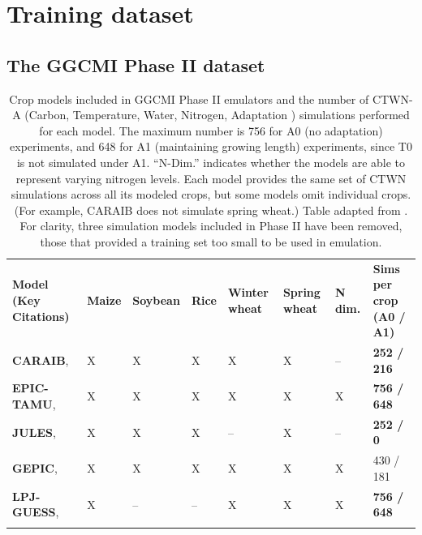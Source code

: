 \documentclass[gmd, manuscript]{copernicus} %
\begin{document}
\section{Training dataset}
\label{S:2}
\subsection{The GGCMI Phase II dataset}

\begin{table}[ht]
    \caption{
    Crop models included in GGCMI Phase II emulators and the number of CTWN-A (Carbon, Temperature, Water, Nitrogen, Adaptation ) simulations performed for each model. 
    The maximum number is 756 for A0 (no adaptation) experiments, and 648 for A1 (maintaining growing length) experiments, since T0 is not simulated under A1. ``N-Dim.'' indicates whether the models are able to represent varying nitrogen levels.
    Each model provides the same set of CTWN simulations across all its modeled crops, but some models omit individual crops. 
    (For example, CARAIB does not simulate spring wheat.)
    Table adapted from \citet{franke2019ctwnexperiment}. 
    For clarity, three simulation models included in Phase II have been removed, those that provided a training set too small to be used in emulation.
    }
    \label{table:models}
    \begin{tabular}{p{6cm} p{1cm} p{1cm} p{1cm} p{1cm} p{1cm} p{1cm} p{1.9cm}}
        \tophline
        \textbf{Model (Key Citations)} & \textbf{Maize} & \textbf{Soybean} & \textbf{Rice} & \textbf{Winter wheat} & \textbf{Spring wheat} & \textbf{N dim.} & \textbf{Sims per crop (A0 / A1)}\\ \middlehline
        \textbf{CARAIB},    \citet{Dury2011, Pirttioja2015}    & X & X & X & X & X & -- & \textbf{252 / 216} \\ \middlehline
        \textbf{EPIC-TAMU}, \citet{Izaurralde06}               & X & X & X & X & X & X & \textbf{756 / 648} \\ \middlehline
        \textbf{JULES},     \citet{Osborne2015, Williams2015, Williams2017} & X & X & X & -- & X & -- & \textbf{252 / 0}\\ \middlehline
        \textbf{GEPIC},     \citet{LIU2007478, FOLBERTH201221} & X & X & X & X & X & X & 430 / 181\\ \middlehline
        \textbf{LPJ-GUESS}, \citet{Lindeskog2013, Olin2015}    & X & -- & -- & X & X & X & \textbf{756 / 648}\\  \middlehline

\end{tabular}
\end{table}
\end{document}
